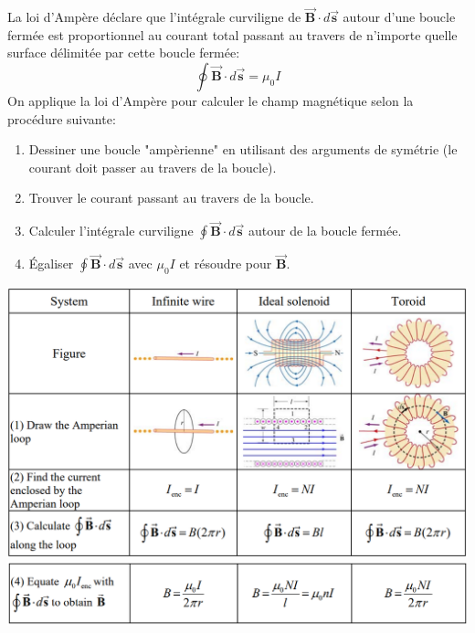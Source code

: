 \documentclass[a4paper]{article}
\begin{document}
La loi d'Ampère déclare que l'intégrale curviligne de $ \vec{\textbf{B}} \cdot d \vec{\textbf{s}} $ autour d'une boucle fermée est proportionnel au courant total passant au travers de n'importe quelle surface délimitée par cette boucle fermée: 
\[ \oint \vec{\textbf{B}} \cdot d \vec{\textbf{s}} = \mu_0 I \]
On applique la loi d'Ampère pour calculer le champ magnétique selon la procédure suivante: 
\begin{enumerate}
    \item Dessiner une boucle "ampèrienne" en utilisant des arguments de symétrie (le courant doit passer au travers de la boucle).
    \item Trouver le courant passant au travers de la boucle.
    \item Calculer l'intégrale curviligne $ \oint \vec{\textbf{B}} \cdot d \vec{\textbf{s}} $ autour de la boucle fermée.
    \item Égaliser $ \oint \vec{\textbf{B}} \cdot d \vec{\textbf{s}} $ avec $ \mu_0 I $ et résoudre pour $ \vec{\textbf{B}} $.
\end{enumerate}
\begin{center}
\includegraphics[width=\textwidth]{Ampere1}
\includegraphics[width=\textwidth]{Ampere2}
\end{center}
\end{document}

